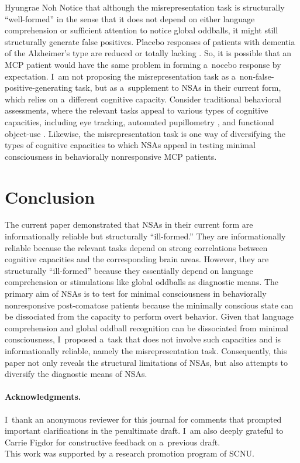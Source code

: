 \begin{artengenv}{Hyungrae Noh}
Notice that although the misrepresentation task is structurally ``well-formed'' in the sense that it does not depend on either language comprehension or sufficient attention to notice global oddballs, it might still structurally generate false positives. Placebo responses of patients with dementia of the Alzheimer's type are reduced or totally lacking
\parencite[][p.349]{benedetti_how_2011}. %
 So, it is possible that an MCP patient would have the same problem in forming a~nocebo response by expectation. I~am not proposing the misrepresentation task as a~non-false-positive-generating task, but as a~supplement to NSAs in their current form, which relies on a~different cognitive capacity. Consider traditional behavioral assessments, where the relevant tasks appeal to various types of cognitive capacities, including eye tracking, automated pupillometry 
\parencite[][]{vassilieva_automated_2019}, %
 and functional object-use 
\parencite[][]{sun_personalized_2018}. %
 Likewise, the misrepresentation task is one way of diversifying the types of cognitive capacities to which NSAs appeal in testing minimal consciousness in behaviorally nonresponsive MCP patients.

\section{Conclusion}
The current paper demonstrated that NSAs in their current form are informationally reliable but structurally ``ill-formed.'' They are informationally reliable because the relevant tasks depend on strong correlations between cognitive capacities and the corresponding brain areas. However, they are structurally ``ill-formed'' because they essentially depend on language comprehension or stimulations like global oddballs as diagnostic means. The primary aim of NSAs is to test for minimal consciousness in behaviorally nonresponsive post-comatose patients because the minimally conscious state can be dissociated from the capacity to perform overt behavior. Given that language comprehension and global oddball recognition can be dissociated from minimal consciousness, I~proposed a~task that does not involve such capacities and is informationally reliable, namely the misrepresentation task. Consequently, this paper not only reveals the structural limitations of NSAs, but also attempts to diversify the diagnostic means of NSAs.

\paragraph{Acknowledgments.}
I~thank an anonymous reviewer for this journal for comments that prompted important clarifications in the penultimate draft. I~am also deeply grateful to Carrie Figdor for constructive feedback on a~previous draft.\\
This work was supported by a research promotion program of SCNU.


\end{artengenv}
